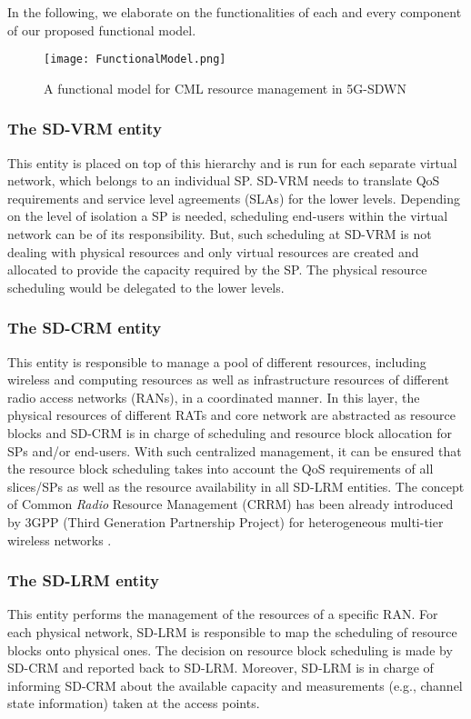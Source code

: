 \documentclass[conference]{IEEEtran}
\begin{document}
In the following, we elaborate on the functionalities of each and every component of our proposed functional model.


\begin{figure*}[!t]
	\centering
	\texttt{[image: FunctionalModel.png]}
	\caption{A functional model for CML resource management in 5G-SDWN}
	\label{Functional_Model}
\end{figure*}


\subsubsection{The SD-VRM entity} This entity is placed on top of this hierarchy and is run for each separate virtual network, which belongs to an individual SP. SD-VRM needs to translate QoS requirements and service level agreements (SLAs) for the lower levels. Depending on the level of isolation a SP is needed, scheduling end-users within the virtual network can be of its responsibility. But, such scheduling at SD-VRM is not dealing with physical resources and only virtual resources are created and allocated to provide the capacity required by the SP. The physical resource scheduling would be delegated to the lower levels. 
 

\subsubsection{The SD-CRM entity} This entity is responsible to manage a pool of different resources, including wireless and computing resources as well as infrastructure resources of different radio access networks (RANs), in a coordinated manner.
In this layer, the physical resources of different RATs and core network are abstracted as resource blocks and SD-CRM is in charge of scheduling and resource block allocation for SPs and/or end-users. With such centralized management, it can be ensured that the resource block scheduling takes into account the QoS requirements of all slices/SPs as well as the resource availability in all SD-LRM entities. The concept of Common \textit{Radio} Resource Management (CRRM) has been already introduced by 3GPP (Third Generation Partnership Project) for heterogeneous multi-tier wireless networks  \cite{perez2008radio}.

\subsubsection{The SD-LRM entity} This entity performs the management of the resources of a specific RAN. For each physical network, SD-LRM is responsible to map the scheduling of resource blocks onto physical ones. The decision on resource block scheduling is made by SD-CRM and reported back to SD-LRM. Moreover, SD-LRM is in charge of informing SD-CRM about the available capacity and measurements (e.g., channel state information) taken at the access points.
\end{document}
